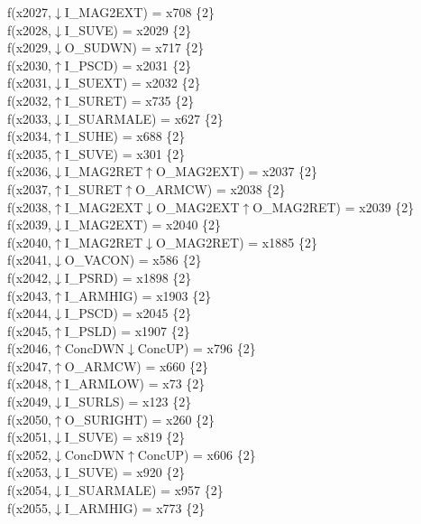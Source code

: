 f(x2027,$\downarrow$I\_MAG2EXT) = x708 \{2\} \\  
f(x2028,$\downarrow$I\_SUVE) = x2029 \{2\} \\  
f(x2029,$\downarrow$O\_SUDWN) = x717 \{2\} \\  
f(x2030,$\uparrow$I\_PSCD) = x2031 \{2\} \\  
f(x2031,$\downarrow$I\_SUEXT) = x2032 \{2\} \\  
f(x2032,$\uparrow$I\_SURET) = x735 \{2\} \\  
f(x2033,$\downarrow$I\_SUARMALE) = x627 \{2\} \\  
f(x2034,$\uparrow$I\_SUHE) = x688 \{2\} \\  
f(x2035,$\uparrow$I\_SUVE) = x301 \{2\} \\  
f(x2036,$\downarrow$I\_MAG2RET$\uparrow$O\_MAG2EXT) = x2037 \{2\} \\  
f(x2037,$\uparrow$I\_SURET$\uparrow$O\_ARMCW) = x2038 \{2\} \\  
f(x2038,$\uparrow$I\_MAG2EXT$\downarrow$O\_MAG2EXT$\uparrow$O\_MAG2RET) = x2039 \{2\} \\  
f(x2039,$\downarrow$I\_MAG2EXT) = x2040 \{2\} \\  
f(x2040,$\uparrow$I\_MAG2RET$\downarrow$O\_MAG2RET) = x1885 \{2\} \\  
f(x2041,$\downarrow$O\_VACON) = x586 \{2\} \\  
f(x2042,$\downarrow$I\_PSRD) = x1898 \{2\} \\  
f(x2043,$\uparrow$I\_ARMHIG) = x1903 \{2\} \\  
f(x2044,$\downarrow$I\_PSCD) = x2045 \{2\} \\  
f(x2045,$\uparrow$I\_PSLD) = x1907 \{2\} \\  
f(x2046,$\uparrow$ConcDWN$\downarrow$ConcUP) = x796 \{2\} \\  
f(x2047,$\uparrow$O\_ARMCW) = x660 \{2\} \\  
f(x2048,$\uparrow$I\_ARMLOW) = x73 \{2\} \\  
f(x2049,$\downarrow$I\_SURLS) = x123 \{2\} \\  
f(x2050,$\uparrow$O\_SURIGHT) = x260 \{2\} \\  
f(x2051,$\downarrow$I\_SUVE) = x819 \{2\} \\  
f(x2052,$\downarrow$ConcDWN$\uparrow$ConcUP) = x606 \{2\} \\  
f(x2053,$\downarrow$I\_SUVE) = x920 \{2\} \\  
f(x2054,$\downarrow$I\_SUARMALE) = x957 \{2\} \\  
f(x2055,$\downarrow$I\_ARMHIG) = x773 \{2\} \\  
